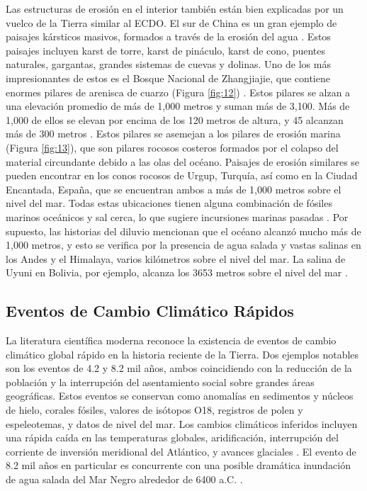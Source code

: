 \documentclass[10pt,twocolumn,letterpaper]{article}
\begin{document}
Las estructuras de erosión en el interior también están bien explicadas por un vuelco de la Tierra similar al ECDO. El sur de China es un gran ejemplo de paisajes kársticos masivos, formados a través de la erosión del agua \cite{82}. Estos paisajes incluyen karst de torre, karst de pináculo, karst de cono, puentes naturales, gargantas, grandes sistemas de cuevas y dolinas. Uno de los más impresionantes de estos es el Bosque Nacional de Zhangjiajie, que contiene enormes pilares de arenisca de cuarzo (Figura \ref{fig:12}) \cite{84}. Estos pilares se alzan a una elevación promedio de más de 1,000 metros y suman más de 3,100. Más de 1,000 de ellos se elevan por encima de los 120 metros de altura, y 45 alcanzan más de 300 metros \cite{85}. Estos pilares se asemejan a los pilares de erosión marina (Figura \ref{fig:13}), que son pilares rocosos costeros formados por el colapso del material circundante debido a las olas del océano. Paisajes de erosión similares se pueden encontrar en los conos rocosos de Urgup, Turquía, así como en la Ciudad Encantada, España, que se encuentran ambos a más de 1,000 metros sobre el nivel del mar. Todas estas ubicaciones tienen alguna combinación de fósiles marinos oceánicos y sal cerca, lo que sugiere incursiones marinas pasadas \cite{15,86,87}. Por supuesto, las historias del diluvio \cite{3} mencionan que el océano alcanzó mucho más de 1,000 metros, y esto se verifica por la presencia de agua salada y vastas salinas en los Andes y el Himalaya, varios kilómetros sobre el nivel del mar. La salina de Uyuni en Bolivia, por ejemplo, alcanza los 3653 metros sobre el nivel del mar \cite{94}.

\subsection{Eventos de Cambio Climático Rápidos}

La literatura científica moderna reconoce la existencia de eventos de cambio climático global rápido en la historia reciente de la Tierra. Dos ejemplos notables son los eventos de 4.2 y 8.2 mil años, ambos coincidiendo con la reducción de la población y la interrupción del asentamiento social sobre grandes áreas geográficas. Estos eventos se conservan como anomalías en sedimentos y núcleos de hielo, corales fósiles, valores de isótopos O18, registros de polen y espeleotemas, y datos de nivel del mar. Los cambios climáticos inferidos incluyen una rápida caída en las temperaturas globales, aridificación, interrupción del corriente de inversión meridional del Atlántico, y avances glaciales \cite{90,91,92}. El evento de 8.2 mil años en particular es concurrente con una posible dramática inundación de agua salada del Mar Negro alrededor de 6400 a.C. \cite{93}.
\end{document}
